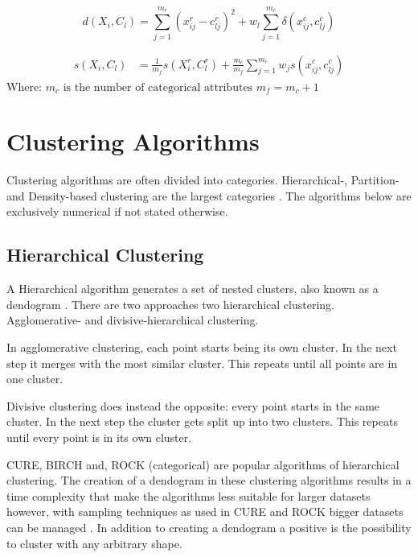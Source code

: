 \documentclass[../report.tex]{subfiles}
\begin{document}
\begin{equation}
\label{eq:protodist}
d(X_i, C_l) = \sum_{j=1}^{m_r}( x_{ij}^{r} - c_{lj}^{r} )^2 +
  w_l \sum_{j=1}^{m_c}\delta( x_{ij}^c, c_{lj}^c )
\end{equation}

\begin{align}
\label{eq:mixJia}
s(X_{i},C_{l}) &= \frac{1}{m_f}s(X_{i}^r,C_{l}^r) + \frac{m_c}{m_f}\sum_{j = 1}^{m_c}{{w_j}s(x_{ij}^c,c_{lj}^c)}
\end{align}
Where:\newline
$m_c \text{ is the number of categorical attributes}$ \newline
$m_f = m_c + 1$




\section{Clustering Algorithms}
Clustering algorithms are often divided into categories. Hierarchical-, Partition- and Density-based clustering are the largest categories \cite{Xu2015}. The algorithms below are exclusively numerical if not stated otherwise.

\subsection{Hierarchical Clustering}
A Hierarchical algorithm generates a set of nested clusters, also known as a dendogram \cite{Xu2015, Jain1999}. There are two approaches two hierarchical clustering. Agglomerative- and divisive-hierarchical clustering.

In agglomerative clustering, each point starts being its own cluster. In the next step it merges with the most similar cluster. This repeats until all points are in one cluster.

Divisive clustering does instead the opposite: every point starts in the same cluster. In the next step the cluster gets split up into two clusters. This repeats until every point is in its own cluster.

CURE\cite{Jain1999}, BIRCH\cite{zhou2012ensemble} and, ROCK (categorical) \cite{Guha2000} are popular algorithms of hierarchical clustering. The creation of a dendogram in these clustering algorithms results in a time complexity that make the algorithms less suitable for larger datasets however, with sampling techniques as used in CURE and ROCK bigger datasets can be managed \cite{Xu2015,Jain1999}. In addition to creating a dendogram a positive is the possibility to cluster with any arbitrary shape. %
\end{document}
